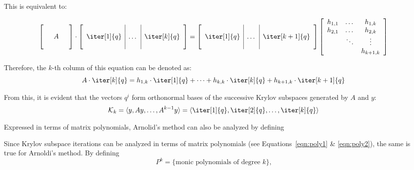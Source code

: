 \noindent This is equivalent to:

\begin{equation}
  \left[
    \begin{array}{ccc}
      &  & \\
      & A & \\
      &  & \\
    \end{array}
  \right] \cdot
  \left[
    \begin{array}{c|c|c}
      & & \\
      \iter[1]{q} &\dots & \iter[k]{q} \\
      & & \\
    \end{array}
  \right] = 
  \left[
    \begin{array}{c|c|c}
      & & \\
      \iter[1]{q} &\dots & \iter[k+1]{q} \\
      & & \\
    \end{array}
  \right]
  \left[
    \begin{array}{ccc}
      h_{1,1} & \dots & h_{1,k} \\
      h_{2,1} & \dots &  h_{2,k}\\
      & \ddots & \vdots \\
      & & h_{k+1, k}  \\
    \end{array}
  \right] 
\end{equation}

\noindent Therefore, the $k$-th column of this equation can be denoted as:
\begin{equation}
    A \cdot \iter[k]{q} = h_{1,k}\cdot \iter[1]{q}+ \cdots + h_{k,k}\cdot \iter[k]{q} + h_{k+1,k}\cdot \iter[k+1]{q}
\end{equation}

\noindent From this, it is evident that the vectors $q^i$ form orthonormal bases of the successive Krylov subspaces generated by $A$ and $y$:
\begin{equation}
\label{eqn:krylov_space}
    \mathcal{K}_k=\langle y, Ay, \dots , A^{k-1}y\rangle = \langle \iter[1]{q},\iter[2]{q}, \dots , \iter[k]{q}\rangle
\end{equation}

\noindent Expressed in terms of matrix polynomials, Arnolid's method can also be analyzed by defining

Since Krylov subspace iterations can be analyzed in terms of matrix polynomials (see Equations~\hyperref[eqn:poly1]{\ref{eqn:poly1}} \& \hyperref[eqn:poly2]{\ref{eqn:poly2}}), the same is true for Arnoldi's method. By defining 
\begin{equation}
\label{eqn:arnoldi_poly}
    P^k = \{\text{monic polynomials of degree }k\}\text{,}
\end{equation}

